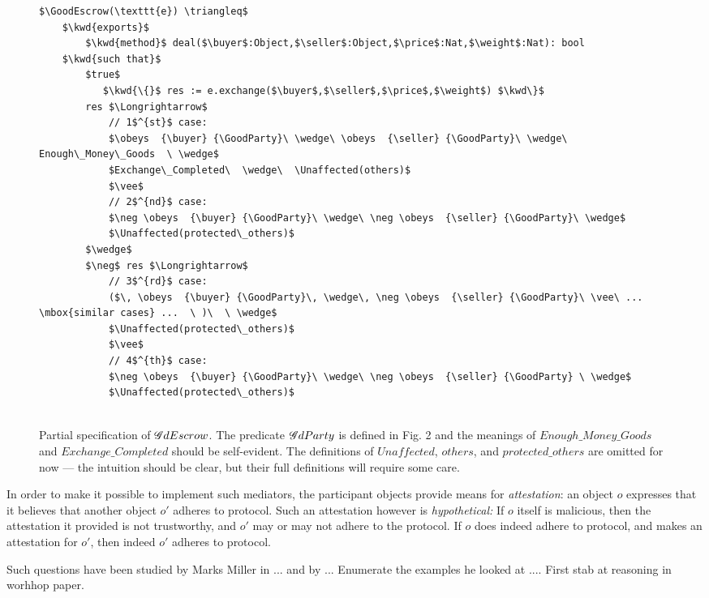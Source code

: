 \documentclass[acmsmall,review,anonymous,screen]{acmart}\settopmatter{printfolios=true,printacmref=false}
\begin{document}
 \begin{figure}[t]
\begin{lstlisting}[mathescape=true, language=Chainmail, frame=lines]
$\GoodEscrow(\texttt{e}) \triangleq$
    $\kwd{exports}$
        $\kwd{method}$ deal($\buyer$:Object,$\seller$:Object,$\price$:Nat,$\weight$:Nat): bool
    $\kwd{such that}$     
        $true$
           $\kwd{\{}$ res := e.exchange($\buyer$,$\seller$,$\price$,$\weight$) $\kwd\}$
        res $\Longrightarrow$
            // 1$^{st}$ case:
            $\obeys  {\buyer} {\GoodParty}\ \wedge\ \obeys  {\seller} {\GoodParty}\ \wedge\   Enough\_Money\_Goods  \ \wedge$
            $Exchange\_Completed\  \wedge\  \Unaffected(others)$
            $\vee$
            // 2$^{nd}$ case:
            $\neg \obeys  {\buyer} {\GoodParty}\ \wedge\ \neg \obeys  {\seller} {\GoodParty}\ \wedge$
            $\Unaffected(protected\_others)$
        $\wedge$
        $\neg$ res $\Longrightarrow$
            // 3$^{rd}$ case:
            ($\, \obeys  {\buyer} {\GoodParty}\, \wedge\, \neg \obeys  {\seller} {\GoodParty}\ \vee\ ...   \mbox{similar cases} ...  \ )\  \ \wedge$   
            $\Unaffected(protected\_others)$
            $\vee$
            // 4$^{th}$ case:
            $\neg \obeys  {\buyer} {\GoodParty}\ \wedge\ \neg \obeys  {\seller} {\GoodParty} \ \wedge$
            $\Unaffected(protected\_others)$
            
\end{lstlisting}
\caption{Partial specification of $\mathcal GdEscrow$.   The predicate $\mathcal GdParty$ is defined in Fig. 2 and the meanings of $\mathit{Enough\_Money\_Goods}$ and $\mathit{Exchange\_Completed}$ should be self-evident. The definitions of $\mathit{Unaffected}$, $\mathit{others}$, and $\mathit{protected\_others}$ are omitted for now — the intuition should be clear, but their full definitions will require some care.}
\label{fig:EscrowSpec}
 \end{figure}


In order to make it possible to implement such mediators, the participant objects   provide means for {\emph{attestation}}:
an object $o$ expresses that it believes that another object $o'$ adheres to protocol. 
Such an attestation however is {\emph{hypothetical:}} If $o$ itself is malicious, then the attestation it provided is not trustworthy, and $o'$
may or may not adhere to the protocol. 
If $o$ does indeed adhere to protocol, and makes an attestation for $o'$, then indeed $o'$ adheres to protocol.


Such questions have been studied by Marks Miller in ... and by ... Enumerate the examples he looked at .... First stab at reasoning in 
worhhop paper.
\end{document}
